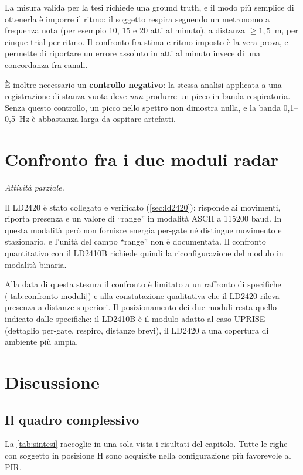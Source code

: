 La misura valida per la tesi richiede una ground truth, e il modo più semplice di
ottenerla è imporre il ritmo: il soggetto respira seguendo un metronomo a
frequenza nota (per esempio 10, 15 e 20 atti al minuto), a distanza $\geq 1{,}5$~m,
per cinque trial per ritmo. Il confronto fra stima e ritmo imposto è la vera prova,
e permette di riportare un errore assoluto in atti al minuto invece di una
concordanza fra canali.

È inoltre necessario un \textbf{controllo negativo}: la stessa analisi applicata a
una registrazione di stanza vuota deve \emph{non} produrre un picco in banda
respiratoria. Senza questo controllo, un picco nello spettro non dimostra nulla, e
la banda 0,1--0,5~Hz è abbastanza larga da ospitare artefatti.

\section{Confronto fra i due moduli radar}
\label{sec:ld2420-risultati}

\emph{Attività parziale.}

Il LD2420 è stato collegato e verificato (\cref{sec:ld2420}): risponde ai movimenti,
riporta presenza e un valore di ``range'' in modalità ASCII a 115200 baud. In questa
modalità però non fornisce energia per-gate né distingue movimento e stazionario, e
l'unità del campo ``range'' non è documentata. Il confronto quantitativo con il
LD2410B richiede quindi la riconfigurazione del modulo in modalità binaria.

Alla data di questa stesura il confronto è limitato a un raffronto di specifiche
(\cref{tab:confronto-moduli}) e alla constatazione qualitativa che il LD2420
rileva presenza a distanze superiori. Il posizionamento dei due moduli resta quello
indicato dalle specifiche: il LD2410B è il modulo adatto al caso UPRISE (dettaglio
per-gate, respiro, distanze brevi), il LD2420 a una copertura di ambiente più ampia.

\section{Discussione}
\label{sec:discussione}

\subsection{Il quadro complessivo}

La \cref{tab:sintesi} raccoglie in una sola vista i risultati del capitolo. Tutte le
righe con soggetto in posizione H sono acquisite nella configurazione più favorevole
al PIR.

